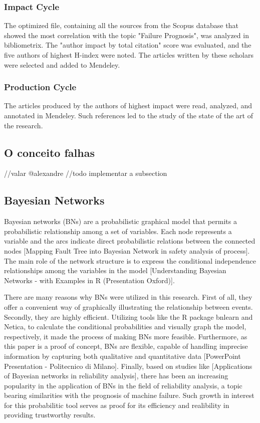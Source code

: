 \subsubsection{Impact Cycle}
The optimized file, containing all the sources from the Scopus database that showed the most correlation with the topic "Failure Prognosis", was analyzed in bibliometrix. 
The "author impact by total citation" score was evaluated, and the five authors of highest H-index were noted. The articles written by these scholars were selected and added to Mendeley.

\subsubsection{Production Cycle}
The articles produced by the authors of highest impact were read, analyzed, and annotated in Mendeley.
Such references led to the study of the state of the art of the research.

\subsection{O conceito falhas}
//valar @alexandre
//todo implementar a subsection


\subsection{Bayesian Networks}
Bayesian networks (BNs) are a probabilistic graphical model that  permits  a  probabilistic  relationship  among a set of variables.  Each  node  represents  a  variable  and  the  arcs  indicate  direct probabilistic  relations  between  the  connected  nodes [Mapping Fault Tree into Bayesian Network in safety analysis of process]. The main role of the network structure is to express the conditional independence relationships among the variables in the model [Understanding Bayesian Networks - with Examples in R (Presentation Oxford)].

There are many reasons why BNs were utilized in this research. First of all, they offer a convenient way of graphically illustrating the relationship between events. Secondly, they are highly efficient. Utilizing tools like the R package bnlearn and Netica, to calculate the conditional probabilities and visually graph the model, respectively, it made the process of making BNs more feasible. Furthermore, as this paper is a proof of concept, BNs are flexible, capable of handling imprecise information by capturing both qualitative and quantitative data [PowerPoint Presentation - Politecnico di Milano]. Finally, based on studies like [Applications of Bayesian networks in reliability analysis], there has been an increasing popularity in the application of BNs in the field of reliability analysis, a topic bearing similarities with the prognosis of machine failure. Such growth in interest for this probabilitic tool serves as proof for its efficiency and realibility in providing trustworthy results.  